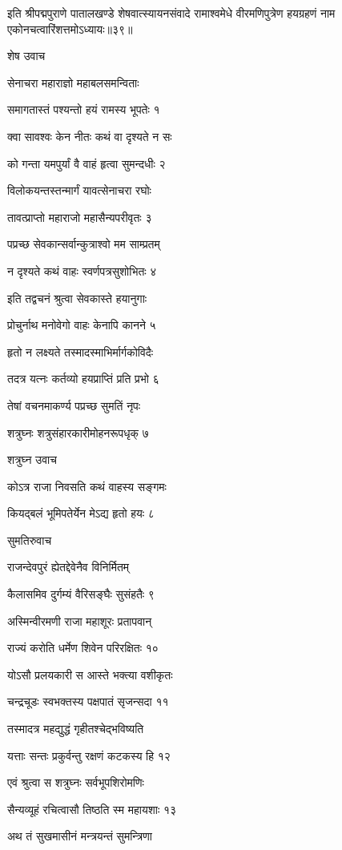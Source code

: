 इति श्रीपद्मपुराणे पातालखण्डे शेषवात्स्यायनसंवादे रामाश्वमेधे वीरमणिपुत्रेण हयग्रहणं नाम एकोनचत्वारिंशत्तमोऽध्यायः॥३९॥


शेष उवाच

सेनाचरा महाराज्ञो महाबलसमन्विताः

समागतास्तं पश्यन्तो हयं रामस्य भूपतेः १

क्वा सावश्वः केन नीतः कथं वा दृश्यते न सः

को गन्ता यमपुर्यां वै वाहं हृत्वा सुमन्दधीः २

विलोकयन्तस्तन्मार्गं यावत्सेनाचरा रघोः

तावत्प्राप्तो महाराजो महासैन्यपरीवृतः ३

पप्रच्छ सेवकान्सर्वान्कुत्राश्वो मम साम्प्रतम्

न दृश्यते कथं वाहः स्वर्णपत्रसुशोभितः ४

इति तद्वचनं श्रुत्वा सेवकास्ते हयानुगाः

प्रोचुर्नाथ मनोवेगो वाहः केनापि कानने ५

हृतो न लक्ष्यते तस्मादस्माभिर्मार्गकोविदैः

तदत्र यत्नः कर्तव्यो हयप्राप्तिं प्रति प्रभो ६

तेषां वचनमाकर्ण्य पप्रच्छ सुमतिं नृपः

शत्रुघ्नः शत्रुसंहारकारीमोहनरूपधृक् ७

शत्रुघ्न उवाच

कोऽत्र राजा निवसति कथं वाहस्य सङ्गमः

कियद्बलं भूमिपतेर्येन मेऽद्य हृतो हयः ८

सुमतिरुवाच

राजन्देवपुरं ह्येतद्देवेनैव विनिर्मितम्

कैलासमिव दुर्गम्यं वैरिसङ्घैः सुसंहतैः ९

अस्मिन्वीरमणी राजा महाशूरः प्रतापवान्

राज्यं करोति धर्मेण शिवेन परिरक्षितः १०

योऽसौ प्रलयकारी स आस्ते भक्त्या वशीकृतः

चन्द्रचूडः स्वभक्तस्य पक्षपातं सृजन्सदा ११

तस्मादत्र महद्युद्धं गृहीतश्चेद्भविष्यति

यत्ताः सन्तः प्रकुर्वन्तु रक्षणं कटकस्य हि १२

एवं श्रुत्वा स शत्रुघ्नः सर्वभूपशिरोमणिः

सैन्यव्यूहं रचित्वासौ तिष्ठति स्म महायशाः १३

अथ तं सुखमासीनं मन्त्रयन्तं सुमन्त्रिणा

